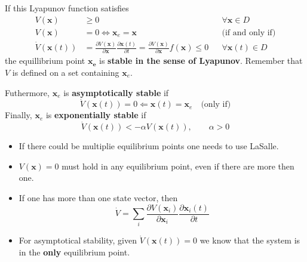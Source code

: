 If this Lyapunov function satisfies
\noindent\begin{align*}
    V(\mathbf{x})          & \geq 0                                                                                                                                                                   &  & \forall \mathbf{x}\in D    \\
    V(\mathbf{x})          & = 0 \Leftrightarrow \mathbf{x}_e = \mathbf{x}                                                                                                                            &  & \text{(if and only if)}    \\
    \dot{V}(\mathbf{x}(t)) & = \frac{\partial V(\mathbf{x})}{\partial \mathbf{x}} \frac{\partial \mathbf{x}(t)}{\partial t} = \frac{\partial V(\mathbf{x})}{\partial \mathbf{x}} f(\mathbf{x}) \leq 0 &  & \forall \mathbf{x}(t)\in D
\end{align*}
the equillibrium point $\mathbf{x_e}$ is \textbf{stable in the sense of Lyapunov}. Remember that $V$ is defined on a set containing $\mathbf{x}_e$.

\newpar{}
Futhermore, $\mathbf{x}_e$ is \textbf{asymptotically stable} if
\noindent\begin{equation*}
    \dot{V}(\mathbf{x}(t)) = 0 \Leftarrow \mathbf{x}(t) = \mathbf{x}_e \quad \text{(only if)}
\end{equation*}
Finally, $\mathbf{x}_e$ is \textbf{exponentially stable} if
\noindent\begin{equation*}
    \dot{V}(\mathbf{x}(t)) < -\alpha V(\mathbf{x}(t)), \qquad \alpha>0
\end{equation*}

\newpar{}
\begin{itemize}
    \item If there could be multiplie equilibrium points one needs to use LaSalle.
    \item $V(\mathbf{x})=0$ must hold in any equilibrium point, even if there are more then one.
    \item If one has more than one state vector, then
          \begin{equation*}
              \dot{V}=\sum_{i} \frac{\partial V(\mathbf{x}_i)}{\partial \mathbf{x}_i} \frac{\partial \mathbf{x}_i(t)}{\partial t}
          \end{equation*}
    \item For asymptotical stability, given $\dot{V}(\mathbf{x}(t)) = 0$ we know that the system is in the \textbf{only} equilibrium point.
\end{itemize}

